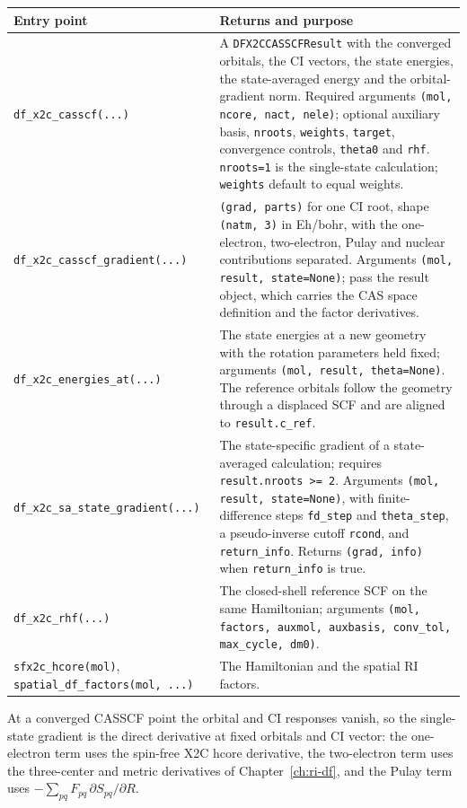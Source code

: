 \begin{center}
\small
\begin{tabularx}{\textwidth}{>{\raggedright\arraybackslash}p{}>{\raggedright\arraybackslash}X}
\toprule
Entry point & Returns and purpose \\
\midrule
\texttt{df\_x2c\_casscf(...)} &
  A \texttt{DFX2CCASSCFResult} with the converged orbitals, the CI
  vectors, the state energies, the state-averaged energy and the
  orbital-gradient norm.  Required arguments \texttt{(mol, ncore, nact,
  nele)}; optional auxiliary basis, \texttt{nroots}, \texttt{weights},
  \texttt{target}, convergence controls, \texttt{theta0} and
  \texttt{rhf}.  \texttt{nroots=1} is the single-state calculation;
  \texttt{weights} default to equal weights. \\
\texttt{df\_x2c\_casscf\_gradient(...)} &
  \texttt{(grad, parts)} for one CI root, shape \texttt{(natm, 3)} in
  Eh/bohr, with the one-electron, two-electron, Pulay and nuclear
  contributions separated.  Arguments \texttt{(mol, result,
  state=None)}; pass the result object, which carries the CAS space
  definition and the factor derivatives. \\
\texttt{df\_x2c\_energies\_at(...)} &
  The state energies at a new geometry with the rotation parameters
  held fixed; arguments \texttt{(mol, result, theta=None)}.  The
  reference orbitals follow the geometry through a displaced SCF and
  are aligned to \texttt{result.c\_ref}. \\
\texttt{df\_x2c\_sa\_state\_gradient(...)} &
  The state-specific gradient of a state-averaged calculation; requires
  \texttt{result.nroots >= 2}.  Arguments \texttt{(mol, result,
  state=None)}, with finite-difference steps \texttt{fd\_step} and
  \texttt{theta\_step}, a pseudo-inverse cutoff \texttt{rcond}, and
  \texttt{return\_info}.  Returns \texttt{(grad, info)} when
  \texttt{return\_info} is true. \\
\texttt{df\_x2c\_rhf(...)} &
  The closed-shell reference SCF on the same Hamiltonian; arguments
  \texttt{(mol, factors, auxmol, auxbasis, conv\_tol, max\_cycle,
  dm0)}. \\
\texttt{sfx2c\_hcore(mol)}, \texttt{spatial\_df\_factors(mol, ...)} &
  The Hamiltonian and the spatial RI factors. \\
\bottomrule
\end{tabularx}
\end{center}

At a converged CASSCF point the orbital and CI responses vanish, so the
single-state gradient is the direct derivative at fixed orbitals and CI
vector: the one-electron term uses the spin-free X2C hcore derivative,
the two-electron term uses the three-center and metric derivatives of
Chapter~\ref{ch:ri-df}, and the Pulay term uses
$-\sum_{pq}F_{pq}\,\partial S_{pq}/\partial R$.

